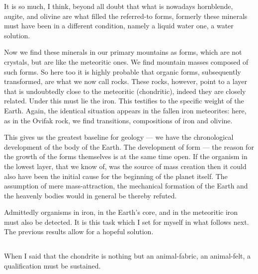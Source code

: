 \documentclass[a4paper, 12pt, oneside]{article}
\begin{document}
It is so much, I think, beyond all doubt that what is nowadays hornblende, augite, and olivine are what filled the referred-to forms, formerly these minerals must have been in a different condition, namely a liquid water one, a water solution.

Now we find these minerals in our primary mountains as forms, which are not crystals, but are like the meteoritic ones. We find mountain masses composed of such forms. So here too it is highly probable that organic forms, subsequently transformed, are what we now call rocks. These rocks, however, point to a layer that is undoubtedly close to the meteoritic (chondritic), indeed they are closely related. Under this must lie the iron. This testifies to the specific weight of the Earth. Again, the identical situation appears in the fallen iron meteorites: here, as in the Ovifak rock, we find transitions, compositions of iron and olivine.

This gives us the greatest baseline for geology --- we have the chronological development of the body of the Earth. The development of form --- the reason for the growth of the forms themselves is at the same time open. If the organism in the lowest layer, that we know of, was the source of mass creation then it could also have been the initial cause for the beginning of the planet itself. The assumption of mere mass-attraction, the mechanical formation of the Earth and the heavenly bodies would in general be thereby refuted.

Admittedly organisms in iron, in the Earth's core, and in the meteoritic iron must also be detected. It is this task which I set for myself in what follows next. The previous results allow for a hopeful solution.
\clearpage
\subsection{}
\paragraph*{}
When I said that the chondrite is nothing but an animal-fabric, an animal-felt, a qualification must be sustained.
\end{document}
